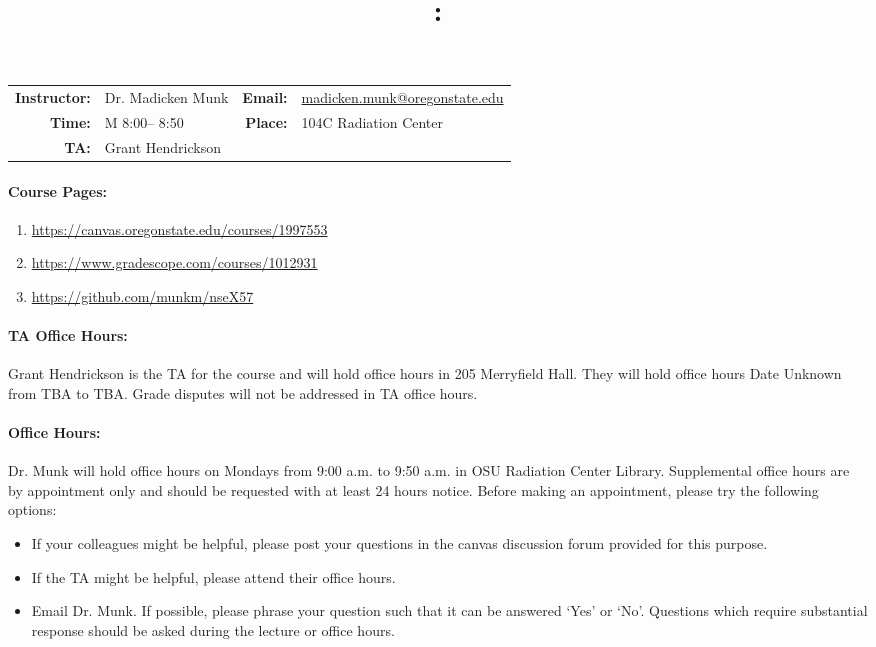 \documentclass[11pt, a4paper]{article}
\title{\CourseNumber: \CourseTitle\\}
\author{\CourseUniversity}
\date{\CourseSemester \CourseYear}
\makeatletter
\newcommand{\CourseInstructor}{Dr. Madicken Munk\xspace}%
\newcommand{\CourseDays}{M\xspace}%
\newcommand{\CourseStart}{8:00\xspace}%
\newcommand{\CourseEnd}{8:50\xspace}%
\newcommand{\CourseInstructorEmail}{madicken.munk@oregonstate.edu}
\newcommand{\CourseRoom}{104C\xspace}%
\newcommand{\CourseBuilding}{Radiation Center\xspace}%
\newcommand{\TeachingAssistant}{Grant Hendrickson \xspace}%
\newcommand{\TAOfficeHourDays}{Date Unknown \xspace}%
\newcommand{\TAOfficeHourStart}{TBA\xspace}%
\newcommand{\TAOfficeHourEnd}{TBA\xspace}%
\newcommand{\TAOfficeHourPlace}{205 Merryfield Hall\xspace}
\newcommand{\MunkOfficeHourDays}{Mondays\xspace}%
\newcommand{\MunkOfficeHourStart}{9:00 a.m.\xspace}%
\newcommand{\MunkOfficeHourEnd}{9:50 a.m.\xspace}%
\newcommand{\MunkOfficeHourPlace}{OSU Radiation Center Library\xspace}
\makeatother
\begin{document}
\maketitle
\renewcommand{\arraystretch}{1.5}
\begin{center}
\begin{table}[h]
\begin{tabularx}{\textwidth}{rXrX}
\hline
\textbf{Instructor:} & \CourseInstructor & \textbf{Email:} & \href{mailto:\CourseInstructorEmail}{\CourseInstructorEmail} \\
\textbf{Time:} & \CourseDays \CourseStart -- \CourseEnd & \textbf{Place:} & \CourseRoom \CourseBuilding \\
\textbf{TA:} & \TeachingAssistant & & \\
\hline
\end{tabularx}
\end{table}
\end{center}

\paragraph{Course Pages:}
\begin{enumerate}
        \item \url{https://canvas.oregonstate.edu/courses/1997553}
        \item \url{https://www.gradescope.com/courses/1012931}
        \item \url{https://github.com/munkm/nseX57}
\end{enumerate}

\paragraph{TA Office Hours:} \TeachingAssistant is the TA for the course and will hold
office hours in \TAOfficeHourPlace.
They will hold office hours \TAOfficeHourDays from
\TAOfficeHourStart to \TAOfficeHourEnd.
Grade disputes will not be addressed in TA office hours.

\paragraph{Office Hours:} Dr. Munk  will hold office hours 
on
\MunkOfficeHourDays from \MunkOfficeHourStart to \MunkOfficeHourEnd in
\MunkOfficeHourPlace. Supplemental office hours are 
by appointment only
and should be requested with at least 24 hours notice.
Before making an appointment, please try the following options:
\begin{itemize}
\item If your colleagues might be helpful, please post your questions in the
        canvas discussion forum provided for this purpose.
\item If the TA might be helpful, please attend their office hours.
\item Email Dr. Munk. If possible, please phrase your question such that it
        can be answered `Yes' or `No'. Questions which require substantial
        response should be asked during the lecture or office hours.
\end{itemize}
\end{document}
